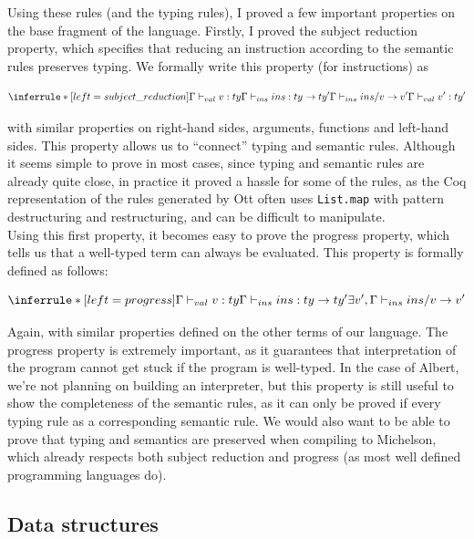 \documentclass{report}
\begin{document}
Using these rules (and the typing rules), I proved a few important properties on the base fragment of the language. Firstly, I proved the subject reduction property, which specifies that reducing an instruction according to the semantic rules preserves typing. We formally write this property (for instructions) as

$$
\inferrule* [left=subject\_reduction]
            { \Gamma \vdash_{val} v : ty \\ \Gamma \vdash_{ins} ins : ty \rightarrow ty' \\ \Gamma \vdash_{ins} ins / v \rightarrow v' }
            { \Gamma \vdash_{val} v' : ty' }
$$

with similar properties on right-hand sides, arguments, functions and left-hand sides. This property allows us to ``connect'' typing and semantic rules. Although it seems simple to prove in most cases, since typing and semantic rules are already quite close, in practice it proved a hassle for some of the rules, as the Coq representation of the rules generated by Ott often uses \texttt{List.map} with pattern destructuring and restructuring, and can be difficult to manipulate.\\

Using this first property, it becomes easy to prove the progress property, which tells us that a well-typed term can always be evaluated. This property is formally defined as follows:

$$
\inferrule* [left=progress]
            { \Gamma \vdash_{val} v : ty \\ \Gamma \vdash_{ins} ins : ty \rightarrow ty' }
            { \exists v', \Gamma \vdash_{ins} ins / v \rightarrow v' }
$$

Again, with similar properties defined on the other terms of our language. The progress property is extremely important, as it guarantees that interpretation of the program cannot get stuck if the program is well-typed. In the case of Albert, we're not planning on building an interpreter, but this property is still useful to show the completeness of the semantic rules, as it can only be proved if every typing rule as a corresponding semantic rule. We would also want to be able to prove that typing and semantics are preserved when compiling to Michelson, which already respects both subject reduction and progress (as most well defined programming languages do).

\subsection{Data structures}
\end{document}
